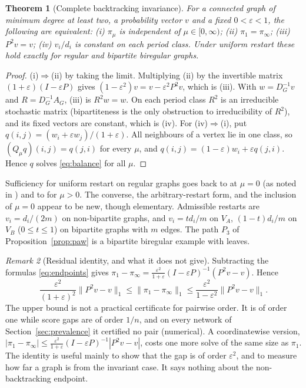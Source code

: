 \documentclass[11pt,a4paper]{article}
\newtheorem{theorem}{Theorem}[section]
\theoremstyle{definition}\newtheorem{conjecture}{Conjecture}
\theoremstyle{remark}\newtheorem{remark}[theorem]{Remark}
\newcommand{\eps}{\varepsilon}
\begin{document}
\begin{theorem}[Complete backtracking invariance]\label{thm:invariance}
For a connected graph of minimum degree at least two, a probability vector $v$ and a fixed $0<\eps<1$, the following are equivalent:
(i) $\pi_\mu$ is independent of $\mu\in[0,\infty)$;
(ii) $\pi_1=\pi_\infty$;
(iii) $P^2v=v$;
(iv) $v_i/d_i$ is constant on each period class.
Under uniform restart these hold exactly for regular and bipartite biregular graphs.
\end{theorem}
\begin{proof}
(i)$\Rightarrow$(ii) by taking the limit. Multiplying (ii) by the invertible matrix $(1+\eps)(I-\eps P)$ gives $(1-\eps^2)v=v-\eps^2P^2v$, which is (iii). With $w=D_G^{-1}v$ and $R=D_G^{-1}A_G$, (iii) is $R^2w=w$. On each period class $R^2$ is an irreducible stochastic matrix (bipartiteness is the only obstruction to irreducibility of $R^2$), and its fixed vectors are constant, which is (iv). For (iv)$\Rightarrow$(i), put $q(i,j)=(w_i+\eps w_j)/(1+\eps)$. All neighbours of a vertex lie in one class, so $(Q_\mu q)(i,j)=q(j,i)$ for every $\mu$, and $q(i,j)=(1-\eps)w_i+\eps q(j,i)$. Hence $q$ solves \eqref{eq:balance} for all $\mu$.
\end{proof}
Sufficiency for uniform restart on regular graphs goes back to \cite[Theorem 4]{arrigo} at $\mu=0$ (as noted in \cite{gloverarxiv}) and to \cite[Theorems 3.1--3.2]{gloverarxiv} for $\mu>0$. The converse, the arbitrary-restart form, and the inclusion of $\mu=0$ appear to be new, though elementary. Admissible restarts are $v_i=d_i/(2m)$ on non-bipartite graphs, and $v_i=td_i/m$ on $V_A$, $(1-t)d_i/m$ on $V_B$ ($0\leq t\leq1$) on bipartite graphs with $m$ edges. The path $P_3$ of Proposition~\ref{prop:paw} is a bipartite biregular example with leaves.

\begin{remark}[Residual identity, and what it does not give]\label{rem:residual}
Subtracting the formulas \eqref{eq:endpoints} gives $\pi_1-\pi_\infty=\frac{\eps^2}{1+\eps}(I-\eps P)^{-1}(P^2v-v)$. Hence
\[
\frac{\eps^2}{(1+\eps)^2}\|P^2v-v\|_1\leq\|\pi_1-\pi_\infty\|_1\leq\frac{\eps^2}{1-\eps^2}\|P^2v-v\|_1 .
\]
The upper bound is not a practical certificate for pairwise order. It is of order one while score gaps are of order $1/n$, and on every network of Section~\ref{sec:prevalence} it certified no pair (numerical). A coordinatewise version, $|\pi_1-\pi_\infty|\leq\frac{\eps^2}{1+\eps}(I-\eps P)^{-1}|P^2v-v|$, costs one more solve of the same size as $\pi_1$. The identity is useful mainly to show that the gap is of order $\eps^2$, and to measure how far a graph is from the invariant case. It says nothing about the non-backtracking endpoint.
\end{remark}
\end{document}
